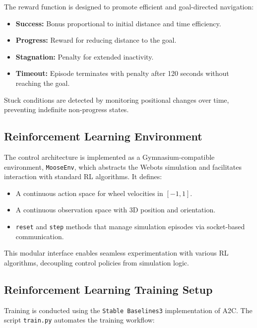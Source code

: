 \documentclass[11pt,twocolumn]{article}
\begin{document}
The reward function is designed to promote efficient and goal-directed navigation:

\begin{itemize}
    \item \textbf{Success:} Bonus proportional to initial distance and time efficiency.
    \item \textbf{Progress:} Reward for reducing distance to the goal.
    \item \textbf{Stagnation:} Penalty for extended inactivity.
    \item \textbf{Timeout:} Episode terminates with penalty after 120 seconds without reaching the goal.
\end{itemize}

Stuck conditions are detected by monitoring positional changes over time, preventing indefinite non-progress states.

\subsection{Reinforcement Learning Environment}

The control architecture is implemented as a Gymnasium-compatible environment, \texttt{MooseEnv}, which abstracts the Webots simulation and facilitates interaction with standard RL algorithms. It defines:

\begin{itemize}
    \item A continuous action space for wheel velocities in \([-1, 1]\).
    \item A continuous observation space with 3D position and orientation.
    \item \texttt{reset} and \texttt{step} methods that manage simulation episodes via socket-based communication.
\end{itemize}

This modular interface enables seamless experimentation with various RL algorithms, decoupling control policies from simulation logic.

\subsection{Reinforcement Learning Training Setup}

Training is conducted using the \texttt{Stable Baselines3} implementation of A2C. The script \texttt{train.py} automates the training workflow:
\end{document}
